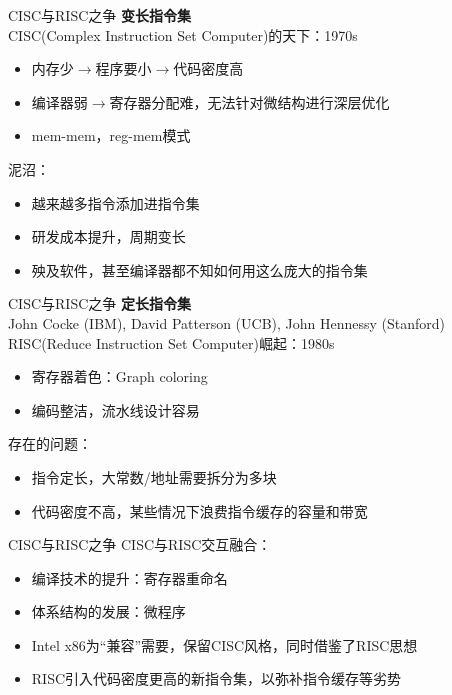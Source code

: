 \documentclass{myslide}
\begin{document}
\begin{frame}{CISC与RISC之争}
\textbf{变长指令集}\\
CISC(Complex Instruction Set Computer)的天下：1970s
\begin{itemize}
	\item 内存少$\to$程序要小$\to$代码密度高
	\item 编译器弱$\to$寄存器分配难，无法针对微结构进行深层优化
	\item mem-mem，reg-mem模式
\end{itemize}
\pause
泥沼：
\begin{itemize}
	\item 越来越多指令添加进指令集
	\item 研发成本提升，周期变长
	\item 殃及软件，甚至编译器都不知如何用这么庞大的指令集
\end{itemize}
\end{frame}

\begin{frame}{CISC与RISC之争}
\textbf{定长指令集}\\
John Cocke (IBM), David Patterson (UCB), John Hennessy (Stanford)\\
RISC(Reduce Instruction Set Computer)崛起：1980s
\begin{itemize}
	\item 寄存器着色：Graph coloring
	\item 编码整洁，流水线设计容易
\end{itemize}
\pause
存在的问题：
\begin{itemize}
	\item 指令定长，大常数/地址需要拆分为多块
	\item 代码密度不高，某些情况下浪费指令缓存的容量和带宽
\end{itemize}
\end{frame}

\begin{frame}{CISC与RISC之争}
CISC与RISC交互融合：
\begin{itemize}
	\item 编译技术的提升：寄存器重命名
	\item 体系结构的发展：微程序
	\item Intel x86为``兼容''需要，保留CISC风格，同时借鉴了RISC思想
	\item RISC引入代码密度更高的新指令集，以弥补指令缓存等劣势
\end{itemize}
\end{frame}
\end{document}
